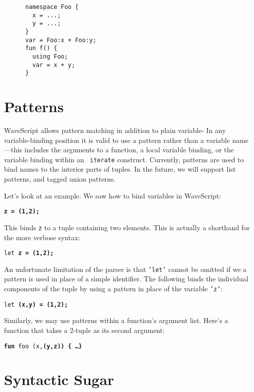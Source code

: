 \documentclass[twocolumn]{report}
\begin{document}
\begin{center}
\begin{verbatim}
      namespace Foo {
        x = ...;
        y = ...;
      }
      var = Foo:x + Foo:y;
      fun f() {
        using Foo;
        var = x + y;
      }
\end{verbatim}
\end{center}


\section{Patterns}
\label{s:patterns}

WaveScript allows pattern matching in addition to plain variable-
In any variable-binding position it is valid to use a pattern rather
than a variable name---this includes the arguments to a function, a
local variable binding, or the variable binding within an {\tt
 iterate} construct.  Currently, patterns are used to bind names
to the interior parts of tuples.  In the future, we will support list
patterns, and tagged union patterns.  

Let's look at an example.
We saw how to bind variables in WaveScript:
\begin{center}
{\tt \bf{z} = (1,2);}
\end{center}
This binds {\tt z} to a tuple containing two elements.  
This is actually a shorthand for the more verbose syntax:
\begin{center}
{\tt let \bf{z} = (1,2);}
\end{center}

An unfortunate limitation of the parser is that {\tt 'let'} cannot be
omitted if we a pattern is used in place of a simple identifier.  The
following binds the individual components of the tuple by using a
pattern in place of the variable {\tt 'z'}:
\begin{center}
{\tt let \bf{(x,y)} = (1,2);}
\end{center}

Similarly, we may use patterns within a function's argument list.  Here's
a function that takes a 2-tuple as its second argument:

\begin{center}
{\tt {\bf fun} foo (x,\bf{(y,z)}) \{ \dots \}}
\end{center}


\section{Syntactic Sugar}
\end{document}
